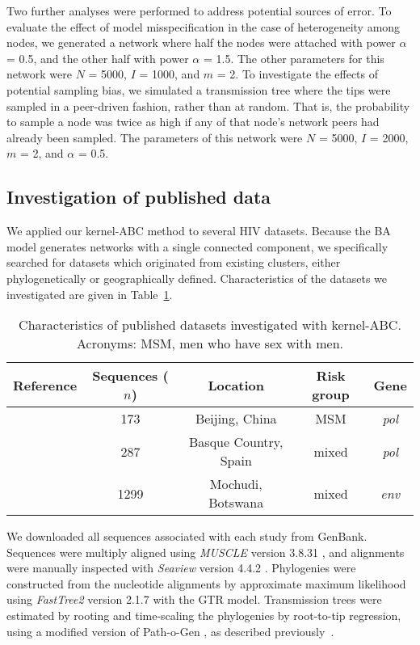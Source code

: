 \documentclass[12pt]{article}\usepackage[]{graphicx}\usepackage[]{color}
\newcommand{\software}[1]{\textit{#1}}
\begin{document}
Two further analyses were performed to address potential sources of error. To
evaluate the effect of model misspecification in the case of heterogeneity
among nodes, we generated a network where half the nodes were attached with
power $\alpha$ = 0.5, and the other half with power $\alpha$ = 1.5. The other
parameters for this network were $N$ = 5000, $I$ = 1000, and $m$ = 2. To
investigate the effects of potential sampling bias, we simulated a transmission
tree where the tips were sampled in a peer-driven fashion, rather than at
random. That is, the probability to sample a node was twice as high if any of
that node's network peers had already been sampled. The parameters of this
network were $N$ = 5000, $I$ = 2000, $m$ = 2, and $\alpha$ = 0.5.

\subsection*{Investigation of published data}

We applied our kernel-ABC method to several HIV datasets. Because the \gls{BA}
model generates networks with a single connected component, we specifically
searched for datasets which originated from existing clusters, either
phylogenetically or geographically defined. Characteristics of the datasets we
investigated are given in Table~\ref{tab:data}.

\begin{table}
  \centering
  \begin{tabular}{ccccc}
    Reference & Sequences ($n$) & Location & Risk group & Gene \\
    \hline
    \autocite{wang2015targeting} & 173 & Beijing, China & MSM & \textit{pol} \\
    \autocite{cuevas2009hiv} & 287 & Basque Country, Spain & mixed & \textit{pol} \\
    \autocite{novitsky2013phylogenetic} & \multirow{2}{*}{1299} & \multirow{2}{*}{Mochudi, Botswana} & \multirow{2}{*}{mixed} & \multirow{2}{*}{\textit{env}} \\
    \autocite{novitsky2014impact} \\
    \hline
  \end{tabular}
  \caption{Characteristics of published datasets investigated with kernel-ABC.
  Acronyms: MSM, men who have sex with men.}
  \label{tab:data}
\end{table}

We downloaded all sequences associated with each study from GenBank. Sequences
were multiply aligned using \software{MUSCLE} version 3.8.31
\autocite{edgar2004muscle}, and alignments were manually inspected with
\software{Seaview} version 4.4.2 \autocite{gouy2010seaview}. Phylogenies were
constructed from the nucleotide alignments by approximate maximum likelihood
using \software{FastTree2} version 2.1.7 \autocite{price2010fasttree} with the
\gls{GTR} model. Transmission trees were estimated by rooting and time-scaling
the phylogenies by root-to-tip regression, using a modified version of
Path-o-Gen \autocite[distributed as part of \software{BEAST},
][]{drummond2007beast}, as described
previously~\autocite{poon2015phylodynamic}. 
\end{document}
